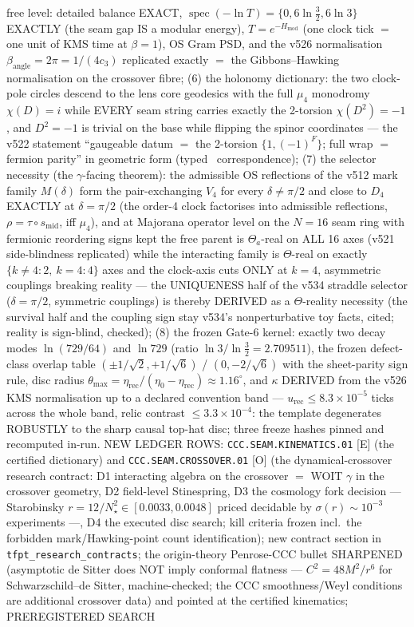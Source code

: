 free level: detailed balance EXACT, $\operatorname{spec}(-\ln T) = \{0, 6\ln\frac32, 6\ln3\}$ EXACTLY (the seam gap IS a modular energy), $T = e^{-H_{\mathrm{mod}}}$ (one clock tick $=$ one unit of KMS time at $\beta = 1$), OS Gram PSD, and the v526 normalisation $\beta_{\mathrm{angle}} = 2\pi = 1/(4c_3)$ replicated exactly $=$ the Gibbons--Hawking normalisation on the crossover fibre; (6) the holonomy dictionary: the two clock-pole circles descend to the lens core geodesics with the full $\mu_4$ monodromy $\chi(D) = i$ while EVERY seam string carries exactly the 2-torsion $\chi(D^2) = -1$, and $D^2 = -1$ is trivial on the base while flipping the spinor coordinates --- the v522 statement ``gaugeable datum $=$ the 2-torsion $\{1, (-1)^F\}$; full wrap $=$ fermion parity'' in geometric form (typed \mC\ correspondence); (7) the selector necessity (the $\gamma$-facing theorem): the admissible OS reflections of the v512 mark family $M(\delta)$ form the pair-exchanging $V_4$ for every $\delta \neq \pi/2$ and close to $D_4$ EXACTLY at $\delta = \pi/2$ (the order-4 clock factorises into admissible reflections, $\rho = \tau \circ s_{\mathrm{mid}}$, iff $\mu_4$), and at Majorana operator level on the $N = 16$ seam ring with fermionic reordering signs kept the free parent is $\Theta_a$-real on ALL 16 axes (v521 side-blindness replicated) while the interacting family is $\Theta$-real on exactly $\{k \neq 4: 2,\ k = 4: 4\}$ axes and the clock-axis cuts ONLY at $k = 4$, asymmetric couplings breaking reality --- the UNIQUENESS half of the v534 straddle selector ($\delta = \pi/2$, symmetric couplings) is thereby DERIVED as a $\Theta$-reality necessity (the survival half and the coupling sign stay v534's nonperturbative toy facts, cited; reality is sign-blind, checked); (8) the frozen Gate-6 kernel: exactly two decay modes $\ln(729/64)$ and $\ln 729$ (ratio $\ln3/\ln\frac32 = 2.709511$), the frozen defect-class overlap table $(\pm1/\sqrt2, +1/\sqrt6)$ / $(0, -2/\sqrt6)$ with the sheet-parity sign rule, disc radius $\theta_{\max} = \eta_{\mathrm{rec}}/(\eta_0 - \eta_{\mathrm{rec}}) \approx 1.16^\circ$, and $\kappa$ DERIVED from the v526 KMS normalisation up to a declared convention band --- $u_{\mathrm{rec}} \le 8.3\times10^{-5}$ ticks across the whole band, relic contrast $\le 3.3\times10^{-4}$: the template degenerates ROBUSTLY to the sharp causal top-hat disc; three freeze hashes pinned and recomputed in-run.  NEW LEDGER ROWS: \texttt{CCC.SEAM.KINEMATICS.01} [E] (the certified dictionary) and \texttt{CCC.SEAM.CROSSOVER.01} [O] (the dynamical-crossover research contract: D1 interacting algebra on the crossover $=$ WOIT $\gamma$ in the crossover geometry, D2 field-level Stinespring, D3 the cosmology fork decision --- Starobinsky $r = 12/N_\star^2 \in [0.0033, 0.0048]$ priced decidable by $\sigma(r) \sim 10^{-3}$ experiments ---, D4 the executed disc search; kill criteria frozen incl.\ the forbidden mark/Hawking-point count identification); new contract section in \texttt{tfpt\_research\_contracts}; the origin-theory Penrose-CCC bullet SHARPENED (asymptotic de Sitter does NOT imply conformal flatness --- $C^2 = 48M^2/r^6$ for Schwarzschild--de Sitter, machine-checked; the CCC smoothness/Weyl conditions are additional crossover data) and pointed at the certified kinematics; PREREGISTERED SEARCH 